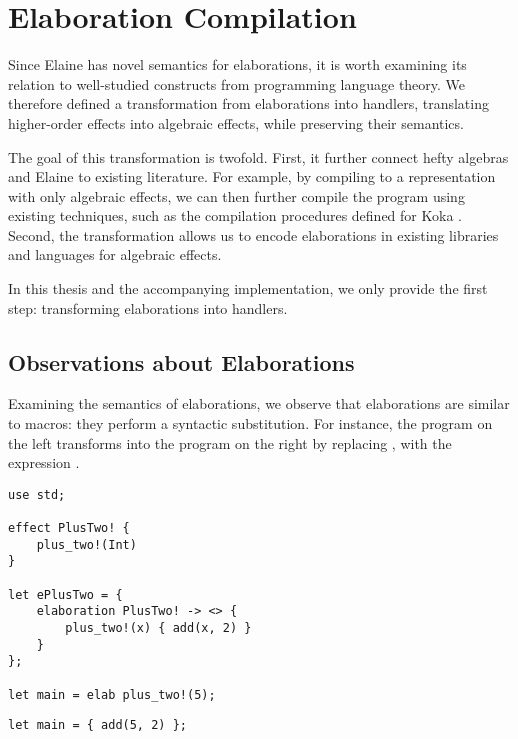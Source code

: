\chapter{Elaboration Compilation}\label{chap:elabcomp}

Since Elaine has novel semantics for elaborations, it is worth examining its relation to well-studied constructs from programming language theory. We therefore defined a transformation from elaborations into handlers, translating higher-order effects into algebraic effects, while preserving their semantics.

The goal of this transformation is twofold. First, it further connect hefty algebras and Elaine to existing literature. For example, by compiling to a representation with only algebraic effects, we can then further compile the program using existing techniques, such as the compilation procedures defined for Koka \autocite{leijen_type_2017}. Second, the transformation allows us to encode elaborations in existing libraries and languages for algebraic effects.

In this thesis and the accompanying implementation, we only provide the first step: transforming elaborations into handlers.

\section{Observations about Elaborations}

Examining the semantics of elaborations, we observe that elaborations are similar to macros: they perform a syntactic substitution. For instance, the program on the left transforms into the program on the right by replacing , with the expression .

\begin{minipage}[b]{0.5\textwidth}
\begin{lstlisting}[language=elaine,style=fancy]
use std;

effect PlusTwo! {
    plus_two!(Int)
}

let ePlusTwo = {
    elaboration PlusTwo! -> <> {
        plus_two!(x) { add(x, 2) }
    }
};

let main = elab plus_two!(5);
\end{lstlisting}
\end{minipage}
\begin{minipage}[b]{0.5\textwidth}
\begin{lstlisting}[language=elaine,style=fancy]
let main = { add(5, 2) };
\end{lstlisting}
\end{minipage}

